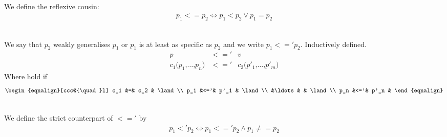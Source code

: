 \begin{definition}[Total ordering, $<=$]\
  \label{def:pat-total-order-weak}\\
  We define the reflexive cousin:
  \begin{eqnarray*}
    p_1 <= p_2 \Longleftrightarrow p_1 < p_2 \lor p_1 = p_2
  \end{eqnarray*}
\end{definition}



\begin{definition}[Partial ordering, $<='$]\
  \label{def:pat-partial-order-weak}\\
  We say that $p_2$ weakly generalises $p_1$ or $p_1$ is at least as specific as
  $p_2$ and we write $p_1 <=' p_2$. Inductively defined.
  \begin{eqnarray}
    p &<='& v \label{eq:pat-partial-order-weak-var}\\
    c_1\texttt{(}p_1\texttt{,} \ldots\texttt{,} p_n\texttt{)} &<='&
    c_2\texttt{(}p'_1\texttt{,} \ldots\texttt{,} p'_m\texttt{)}
    \label{eq:pat-partial-order-weak-con}
  \end{eqnarray}
  Where  hold if
  \[
  \begin{eqnalign}[ccc@{\quad}l]
    c_1 &=& c_2 & \land\\
    p_1 &<='& p'_1 & \land\\
    &\ldots& & \land\\
    p_n &<='& p'_n &
  \end{eqnalign}
  \]
\end{definition}



\begin{definition}\
  \label{def:pat-partial-order-strict}\\
  We define the strict counterpart of $<='$ by
  \begin{eqnarray*}
      p_1 <' p_2 \Longleftrightarrow p_1 <=' p_2 \land p_1 \not == p_2
  \end{eqnarray*}
\end{definition}

